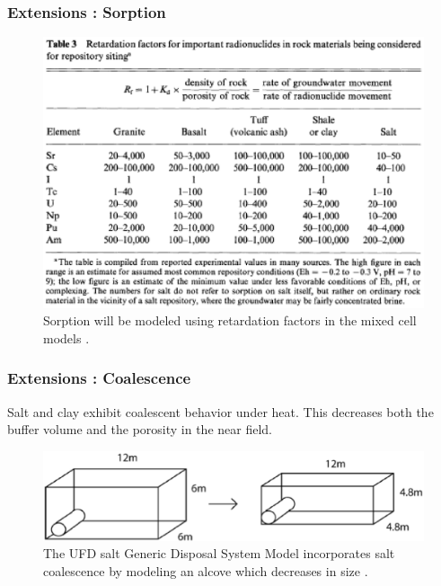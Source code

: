 \begin{frame}[ctb!]
  \frametitle{Extensions : Sorption}
  \begin{figure}[h!]
      \includegraphics[height=.75\textheight]{sorptionKrauskopf.eps}
    \caption{Sorption will be modeled using retardation factors in the mixed 
    cell models \cite{krauskopf_geology_1988}.}
    \label{fig:sorptionKrauskopf}
  \end{figure}
\end{frame}


\begin{frame}[ctb!]
  \frametitle{Extensions : Coalescence}
  Salt and clay exhibit coalescent behavior under heat. This decreases both the 
  buffer volume and the porosity in the near field.
  \begin{figure}[h!]
    \begin{center}
      \includegraphics[width=\textwidth]{saltAlcoveGPAM.eps}
    \end{center}
    \caption{The UFD salt Generic Disposal System Model incorporates salt 
    coalescence by modeling an alcove which decreases in size 
    \cite{clayton_generic_2011}.}
    \label{fig:saltAlcoveGPAM}
  \end{figure}
\end{frame}

